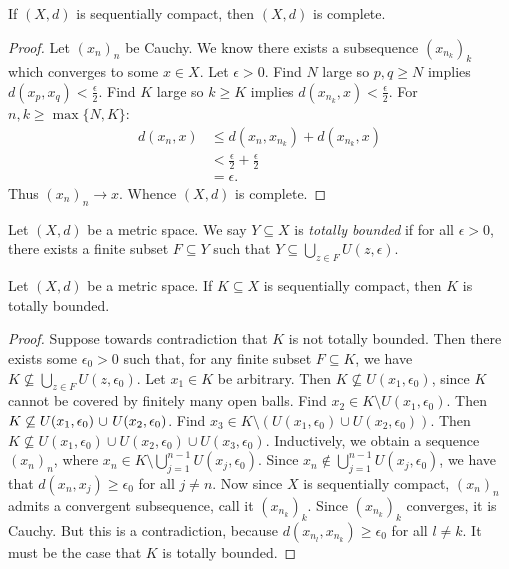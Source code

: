     \begin{proposition}\label{prop:seq-implies-complete}
        If $(X,d)$ is sequentially compact, then $(X,d)$ is complete.
    \end{proposition}
        \begin{proof}
            Let $(x_n)_n$ be Cauchy. We know there exists a subsequence $(x_{n_k})_k$ which converges to some $x \in X$. Let $\epsilon > 0$. Find $N$ large so $p,q \geq N$ implies $d(x_p,x_q) < \frac{\epsilon}{2}$. Find $K$ large so $k \geq K$ implies $d(x_{n_k},x) < \frac{\epsilon}{2}$. For $n,k \geq \max\{N,K\}$:
                \begin{equation*}
                \begin{split}
                    d(x_n,x)
                    & \leq d(x_n,x_{n_k}) + d(x_{n_k}, x) \\
                    & < \frac{\epsilon}{2} + \frac{\epsilon}{2} \\
                    & = \epsilon.
                \end{split}
                \end{equation*}
            Thus $(x_n)_n \rightarrow x$. Whence $(X,d)$ is complete.
        \end{proof}

    \begin{definition}
        Let $(X,d)$ be a metric space. We say $Y \subseteq X$ is \textit{totally bounded} if for all $\epsilon > 0$, there exists a finite subset $F\subseteq Y$ such that $Y \subseteq \bigcup_{z \in F}U(z,\epsilon)$.
    \end{definition}

    \begin{proposition}\label{prop:sequential-implies-tot-bounded}
        Let $(X,d)$ be a metric space. If $K \subseteq X$ is sequentially compact, then $K$ is totally bounded.
    \end{proposition}
        \begin{proof}
            Suppose towards contradiction that $K$ is not totally bounded. Then there exists some $\epsilon_0 > 0$ such that, for any finite subset $F \subseteq K$, we have $K \not\subseteq \bigcup_{z \in F}U(z,\epsilon_0)$. Let $x_1 \in K$ be arbitrary. Then $K \not\subseteq U(x_1,\epsilon_0)$, since $K$ cannot be covered by finitely many open balls. Find $x_2 \in K \setminus U(x_1,\epsilon_0)$. Then $K \not\subseteq U(x_1,\epsilon_0) \h1\cup\h1 U(x_2,\epsilon_0)$. Find $x_3 \in K \setminus \left( U(x_1,\epsilon_0) \cup U(x_2,\epsilon_0) \right)$. Then $K \not\subseteq U(x_1,\epsilon_0) \cup U(x_2,\epsilon_0) \cup U(x_3,\epsilon_0)$. Inductively, we obtain a sequence $(x_n)_n$, where $x_n \in K \setminus \bigcup_{j = 1}^{n-1}U(x_j,\epsilon_0)$. Since $x_n \not\in \bigcup_{j = 1}^{n-1}U(x_j,\epsilon_0)$, we have that $d(x_n,x_j) \geq \epsilon_0$ for all $j \neq n$. Now since $X$ is sequentially compact, $(x_n)_n$ admits a convergent subsequence, call it $(x_{n_k})_k$. Since $(x_{n_k})_k$ converges, it is Cauchy. But this is a contradiction, because $d(x_{n_l},x_{n_k}) \geq \epsilon_0$ for all $l \neq k$. It must be the case that $K$ is totally bounded.
        \end{proof}

